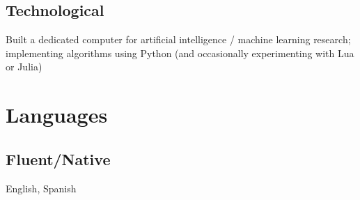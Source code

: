 \documentclass{adk_cv}
\begin{document}
\begin{minipage}[t]{\dimexpr.36\linewidth}
\begin{flushleft}
\subsection{Technological}
Built a dedicated computer for artificial intelligence / machine learning research; implementing algorithms using Python (and occasionally experimenting with Lua or Julia) \\ 

\section{Languages}
\subsection{Fluent/Native}
English, Spanish
    \end{flushleft}
\end{minipage}
\hfill\begingroup\hspace{-15pt}\endgroup\hfill
\end{document}
